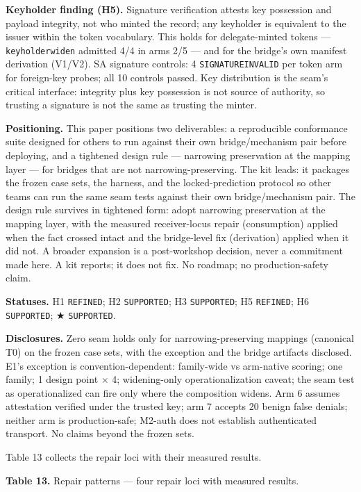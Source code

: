 \documentclass[
  10pt,
]{article}
\let\origtexttt\texttt
\renewcommand{\texttt}[1]{{\upshape\origtexttt{#1}}}
\renewcommand{\_}{\origunderscore\allowbreak}
\begin{document}
\textbf{Keyholder finding (H5).} Signature verification attests key
possession and payload integrity, not who minted the record; any
keyholder is equivalent to the issuer within the token vocabulary. This
holds for delegate-minted tokens --- \texttt{keyholder\_widen} admitted
4/4 in arms 2/5 --- and for the bridge's own manifest derivation
(V1/V2). SA signature controls: 4 \texttt{SIGNATURE\_INVALID} per token
arm for foreign-key probes; all 10 controls passed. Key distribution is
the seam's critical interface: integrity plus key possession is not
source of authority, so trusting a signature is not the same as trusting
the minter.

\textbf{Positioning.} This paper positions two deliverables: a
reproducible conformance suite designed for others to run against their
own bridge/mechanism pair before deploying, and a tightened design rule
--- narrowing preservation at the mapping layer --- for bridges that are
not narrowing-preserving. The kit leads: it packages the frozen case
sets, the harness, and the locked-prediction protocol so other teams can
run the same seam tests against their own bridge/mechanism pair. The
design rule survives in tightened form: adopt narrowing preservation at
the mapping layer, with the measured receiver-locus repair (consumption)
applied when the fact crossed intact and the bridge-level fix
(derivation) applied when it did not. A broader expansion is a
post-workshop decision, never a commitment made here. A kit reports; it
does not fix. No roadmap; no production-safety claim.

\textbf{Statuses.} H1 \texttt{REFINED}; H2 \texttt{SUPPORTED}; H3
\texttt{SUPPORTED}; H5 \texttt{REFINED}; H6 \texttt{SUPPORTED}; ★
\texttt{SUPPORTED}.

\textbf{Disclosures.} Zero seam holds only for narrowing-preserving
mappings (canonical T0) on the frozen case sets, with the exception and
the bridge artifacts disclosed. E1's exception is convention-dependent:
family-wide vs arm-native scoring; one family; 1 design point × 4;
widening-only operationalization caveat; the seam test as
operationalized can fire only where the composition widens. Arm 6
assumes attestation verified under the trusted key; arm 7 accepts 20
benign false denials; neither arm is production-safe; M2-auth does not
establish authenticated transport. No claims beyond the frozen sets.

Table 13 collects the repair loci with their measured results.

\textbf{Table 13.} Repair patterns --- four repair loci with measured
results.
\end{document}
